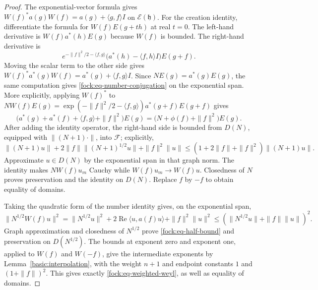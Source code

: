 \documentclass[11pt,a4paper]{article}
\theoremstyle{definition}
\theoremstyle{remark}
\begin{document}
\begin{proof}
The exponential-vector formula gives
$W(f)^*a(g)W(f)=a(g)+\langle g,f\rangle I$ on $\mathcal E(\mathfrak h)$.
For the creation identity, differentiate the formula for
$W(f)E(g+th)$ at real $t=0$. The left-hand derivative is
$W(f)a^*(h)E(g)$ because $W(f)$ is bounded. The right-hand derivative is
\[
 e^{-\|f\|^2/2-\langle f,g\rangle}
 \big(a^*(h)-\langle f,h\rangle I\big)E(g+f).
\]
Moving the scalar term to the other side gives
$W(f)^*a^*(g)W(f)=a^*(g)+\langle f,g\rangle I$.
Since $NE(g)=a^*(g)E(g)$, the same computation gives
\eqref{fock:eq-number-conjugation} on the exponential span. More
explicitly, applying $W(f)^*$ to
$N W(f)E(g)=\exp(-\|f\|^2/2-\langle f,g\rangle)
a^*(g+f)E(g+f)$ gives
\[
 \big(a^*(g)+a^*(f)+\langle f,g\rangle+\|f\|^2\big)E(g)
       =\big(N+\phi(f)+\|f\|^2\big)E(g).
\]
After adding the identity operator, the right-hand side is bounded
from $D(N)$, equipped with $\|(N+1)\cdot\|$, into $\mathcal F$;
explicitly,
\[
 \|(N+1)u\|+2\|f\|\|(N+1)^{1/2}u\|+\|f\|^2\|u\|
       \leq(1+2\|f\|+\|f\|^2)\|(N+1)u\|.
\]
Approximate $u\in D(N)$ by the exponential span in that graph norm.
The identity makes $NW(f)u_m$ Cauchy while $W(f)u_m\to W(f)u$.
Closedness of $N$ proves preservation and the identity on $D(N)$.
Replace $f$ by $-f$ to obtain equality of domains.

Taking the quadratic form of the number identity gives, on the
exponential span,
\[
 \|N^{1/2}W(f)u\|^2
 =\|N^{1/2}u\|^2+2\operatorname{Re}\langle u,a(f)u\rangle
                     +\|f\|^2\|u\|^2
 \leq(\|N^{1/2}u\|+\|f\|\|u\|)^2.
\]
Graph approximation and closedness of $N^{1/2}$ prove
\eqref{fock:eq-half-bound} and preservation on $D(N^{1/2})$.
The bounds at exponent zero and exponent one, applied to $W(f)$ and
$W(-f)$, give the intermediate exponents by
Lemma~\ref{basic:interpolation}, with the weight $n+1$ and endpoint
constants $1$ and $(1+\|f\|)^2$. This gives exactly
\eqref{fock:eq-weighted-weyl}, as well as equality of domains.

\end{proof}
\end{document}
